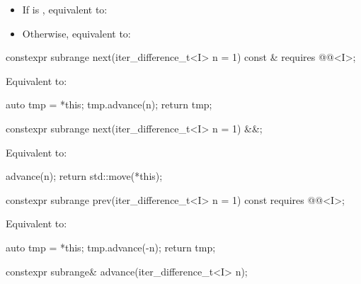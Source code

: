 \begin{itemdescr}
\pnum
\effects
\begin{itemize}
\item If  is , equivalent to: 
\item Otherwise, equivalent to: 
\end{itemize}
\end{itemdescr}

%
\begin{itemdecl}
constexpr subrange next(iter_difference_t<I> n = 1) const &
  requires @@<I>;
\end{itemdecl}

\begin{itemdescr}
\pnum
\effects
Equivalent to:
\begin{codeblock}
auto tmp = *this;
tmp.advance(n);
return tmp;
\end{codeblock}
\end{itemdescr}

%
\begin{itemdecl}
constexpr subrange next(iter_difference_t<I> n = 1) &&;
\end{itemdecl}

\begin{itemdescr}
\pnum
\effects
Equivalent to:
\begin{codeblock}
advance(n);
return std::move(*this);
\end{codeblock}
\end{itemdescr}

%
\begin{itemdecl}
constexpr subrange prev(iter_difference_t<I> n = 1) const
  requires @@<I>;
\end{itemdecl}

\begin{itemdescr}
\pnum
\effects
Equivalent to:
\begin{codeblock}
auto tmp = *this;
tmp.advance(-n);
return tmp;
\end{codeblock}
\end{itemdescr}

%
\begin{itemdecl}
constexpr subrange& advance(iter_difference_t<I> n);
\end{itemdecl}

